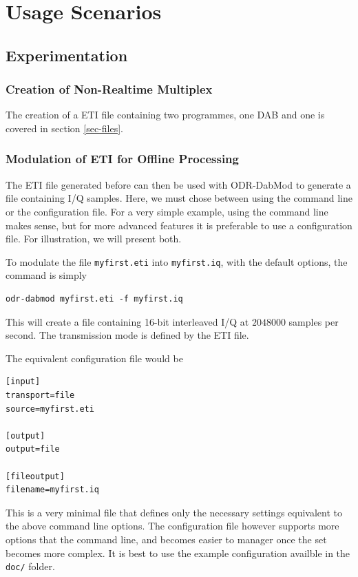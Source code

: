 \section{Usage Scenarios}
\subsection{Experimentation}
\subsubsection{Creation of Non-Realtime Multiplex}
The creation of a ETI file containing two programmes, one DAB and one
\dabplus{} is covered in section \ref{sec-files}.

\subsubsection{Modulation of ETI for Offline Processing}
The ETI file generated before can then be used with ODR-DabMod to generate a
file containing I/Q samples. Here, we must chose between using the command line
or the configuration file. For a very simple example, using the command line
makes sense, but for more advanced features it is preferable to use a
configuration file. For illustration, we will present both.

To modulate the file \texttt{myfirst.eti} into \texttt{myfirst.iq}, with the
default options, the command is simply

\begin{lstlisting}
odr-dabmod myfirst.eti -f myfirst.iq
\end{lstlisting}

This will create a file containing 16-bit interleaved I/Q at $2048000$ samples
per second. The transmission mode is defined by the ETI file.

The equivalent configuration file would be
\begin{lstlisting}
[input]
transport=file
source=myfirst.eti

[output]
output=file

[fileoutput]
filename=myfirst.iq
\end{lstlisting}

This is a very minimal file that defines only the necessary settings equivalent
to the above command line options. The configuration file however supports more
options that the command line, and becomes easier to manager once the set
becomes more complex. It is best to use the example configuration availble in
the \texttt{doc/} folder.

